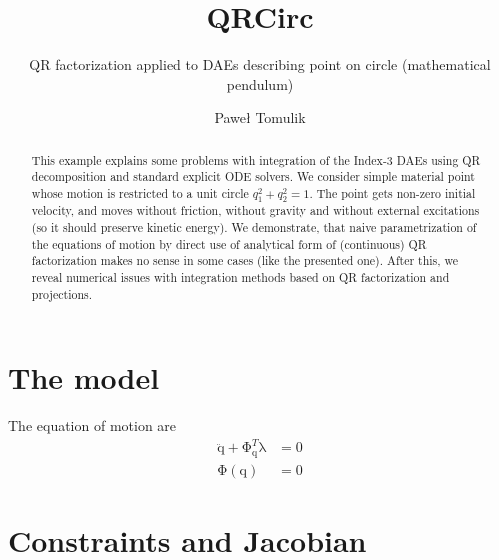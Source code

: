 \documentclass{scrartcl}
\title{QRCirc}
\subtitle{QR factorization applied to DAEs describing point on circle (mathematical pendulum)}
\author{Paweł Tomulik}
\newcommand\mMat[1]{\ensuremath{\boldsymbol{\mathrm{#1}}}}
\newcommand\mVec[1]{\ensuremath{\boldsymbol{\mathrm{#1}}}}
\newcommand\mOf[1]{\left({#1}\right)}
\begin{document}
\maketitle

\begin{abstract}
This example explains some problems with integration of the Index-3 DAEs using
QR decomposition and standard explicit ODE solvers. We consider simple material
point whose motion is restricted to a unit circle $q_1^2 + q_2^2 = 1$. The
point gets non-zero initial velocity, and moves without friction, without
gravity and without external excitations (so it should preserve kinetic
energy). We demonstrate, that naive parametrization of the equations of motion
by direct use of analytical form of (continuous) QR factorization makes no
sense in some cases (like the presented one). After this, we reveal numerical
issues with integration methods based on QR factorization and projections.
\end{abstract}

\section{The model}
The equation of motion are
\begin{subequations}
\label{eq:6HKMG}
\begin{align}
  \label{eq:X83SF}
  \mVec{\ddot q} + \mMat{\Phi}_{\mVec{q}}^T \mVec{\lambda} &= \mVec{0}
  \\
  \label{eq:HVFIS}
  \mVec{\Phi}\mOf{\mVec{q}} &= \mVec{0}
\end{align}
\end{subequations}

\section{Constraints and Jacobian}
\end{document}
